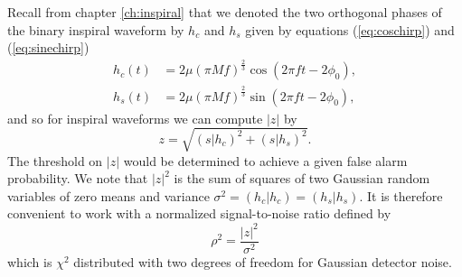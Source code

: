 Recall from chapter \ref{ch:inspiral} that we denoted the two orthogonal
phases of the binary inspiral waveform by $h_c$ and $h_s$ given by equations
(\ref{eq:coschirp}) and (\ref{eq:sinechirp})
\begin{align}
h_c(t) & = 2\mu (\pi M f)^{\frac{2}{3}} \cos(2\pi f t - 2\phi_0), \\
h_s(t) & = 2\mu (\pi M f)^{\frac{2}{3}} \sin(2\pi f t - 2\phi_0),
\end{align}
and so for inspiral waveforms we can compute $|z|$ by
\begin{equation}
z = \sqrt{(s|h_c)^2 + (s|h_s)^2}.
\end{equation}
The threshold on $|z|$ would be determined to achieve a given false alarm
probability. We note that $|z|^2$ is the sum of squares of two Gaussian random
variables of zero means and variance $\sigma^2 = (h_c|h_c) = (h_s|h_s)$. It is
therefore convenient to work with a normalized signal-to-noise ratio
defined by
\begin{equation}
\rho^2 = \frac{|z|^2}{\sigma^2}
\label{eq:snrrootdef}
\end{equation}
which is $\chi^2$ distributed with two degrees of freedom for Gaussian
detector noise.

